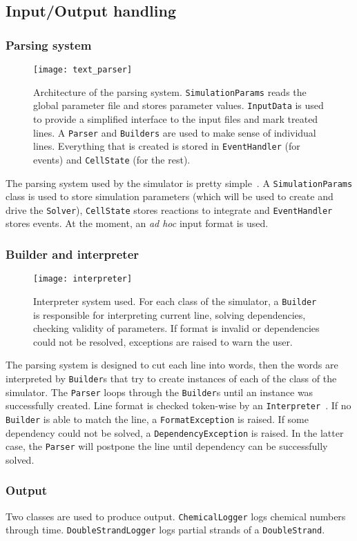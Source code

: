 
\subsection{Input/Output handling}

\subsubsection{Parsing system}

\begin{figure}[!h]
  \centering
  \texttt{[image: text\_parser]}
  \caption{Architecture of the parsing system. \texttt{SimulationParams} reads the global parameter file and stores parameter values. \texttt{InputData} is used to provide a simplified interface to the input files and mark treated lines. A \texttt{Parser} and \texttt{Builders} are used to make sense of individual lines. Everything that is created is stored in \texttt{EventHandler} (for events) and \texttt{CellState} (for the rest). }
  \label{fig:text_parser}
\end{figure}

The parsing system used by the simulator is pretty simple~. A \texttt{SimulationParams} class is used to store simulation parameters (which will be used to create and drive the \texttt{Solver}), \texttt{CellState} stores reactions to integrate and \texttt{EventHandler} stores events. At the moment, an \textit{ad hoc} input format is used.

\subsubsection{Builder and interpreter}

\begin{figure}[!h]
  \centering
  \texttt{[image: interpreter]}
  \caption{Interpreter system used. For each class of the simulator, a \texttt{Builder} is responsible for interpreting current line, solving dependencies, checking validity of parameters. If format is invalid or dependencies could not be resolved, exceptions are raised to warn the user.}
  \label{fig:interpreter}
\end{figure}

The parsing system is designed to cut each line into words, then the words are interpreted by \texttt{Builder}s that try to create instances of each of the class of the simulator. The \texttt{Parser} loops through the \texttt{Builder}s until an instance was successfully created. Line format is checked token-wise by an \texttt{Interpreter}~. If no \texttt{Builder} is able to match the line, a \texttt{FormatException} is raised. If some dependency could not be solved, a \texttt{DependencyException} is raised. In the latter case, the \texttt{Parser} will postpone the line until dependency can be successfully solved.

\subsubsection{Output}

Two classes are used to produce output. \texttt{ChemicalLogger} logs chemical numbers through time. \texttt{DoubleStrandLogger} logs partial strands of a \texttt{DoubleStrand}.

